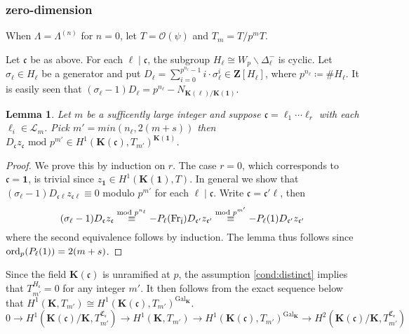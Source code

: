 \documentclass[leqno]{amsart}
\newtheorem{lem}[thm]{Lemma}
\theoremstyle{definition}
\theoremstyle{remark}
\newcommand{\id}{\mathbf{1}}
\newcommand{\oo}{\mathcal{O}}
\newcommand{\Z}{{\mathbf{Z}}}
\DeclareMathOperator{\Gal}{Gal}
\newcommand{\Fr}{\textnormal{Fr}} %
\newcommand{\fc}{\mathfrak{c}}
\newcommand{\fl}{\mathfrak{l}}
\newcommand{\K}{{\mathbf{K}}} %
\newcommand{\flw}{\bar{\fl}}
\newcommand{\rp}[1]{\mathfrak{C}_{#1}} %
\newcommand{\rs}[1]{H_{#1}} %
\newcommand{\rk}[1]{\K({#1})} %
\newcommand{\ord}{\textnormal{ord}} %
\begin{document}
\subsubsection{zero-dimension}

When $\Lambda=\Lambda^{(n)}$ for $n=0$,
let  $T=\oo(\psi)$ and  $T_m=T/p^mT$.

Let $\fc$ be as above.
For each $\ell\mid\fc$,
the subgroup  $\rs{\ell}\cong W_p\backslash \Delta_\ell^-$
is cyclic.
Let  $\sigma_\ell\in \rs{\ell}$ be a generator
and put 
$D_\ell=\sum_{i=0}^{p^{n_\ell}-1}i\cdot \sigma_\ell^i
\in \Z[\rs{\ell}]$,
where $p^{n_\ell}\coloneqq \#\rs{\ell}$.
It is easily seen that 
$(\sigma_\ell-1)D_\ell=p^{n_\ell}-N_{\rk{\ell}/\rk{\id}}$.

\begin{lem}
Let $m$ be a sufficently large integer and
suppose $\fc=\ell_1\cdots\ell_r$
with each $\ell_i\in\mathcal{L}_m$.
Pick $m'=min(n_\ell, 2(m+s))$ then
$D_{\fc}z_{\fc}\text{ mod }p^{m'}\in 
H^1(\rk{\fc},T_{m'})^{\rk{\id}}$.
\end{lem}
\begin{proof}
We prove this by induction on $r$.
The case $r=0$, which corresponds to 
$\fc=\id$, is trivial
since $z_{\id}\in H^1(\rk{\id},T)$.
In general
we show that 
$(\sigma_\ell-1)D_{\fc\ell}z_{\fc\ell}\equiv 0$
modulo  $p^{m'}$ for each $\ell\mid \fc$.
Write $\fc=\fc'\ell$, then
\[
	 (\sigma_\ell-1)D_{\fc}z_{\fc}
	 \overset{\text{mod } p^{n_\ell}}{\equiv}
	 -P_\ell(\Fr_{\flw})D_{\fc'}z_{\fc'}
	 \overset{\text{mod } p^{m'}}{\equiv}
	 -P_\ell(1)D_{\fc'}z_{\fc'}
\]
where the second equivalence follows by induction.
The lemma thus follows
since $\ord_p(P_\ell(1))=2(m+s)$.
\end{proof}
Since the field $\rk{\fc}$
is unramified at  $p$,
the assumption \eqref{cond:distinct}
implies that $T_{m'}^{\rs{\fc}}=0$
for any integer $m'$. 
It then follows from the exact sequence below
that $H^1(\K, T_{m'})\cong 
H^1(\rk{\fc}, T_{m'})^{\Gal_\K}$.
\[
	0\to H^1(\rk{\fc}/\K, T_{m'}^{\rp{\fc}})\to
	H^1(\K, T_{m'})\to
	H^1(\rk{\fc}, T_{m'})^{\Gal_\K}\to
	H^2(\rk{\fc}/\K, T_{m'}^{\rp{\fc}})
\]
\end{document}
